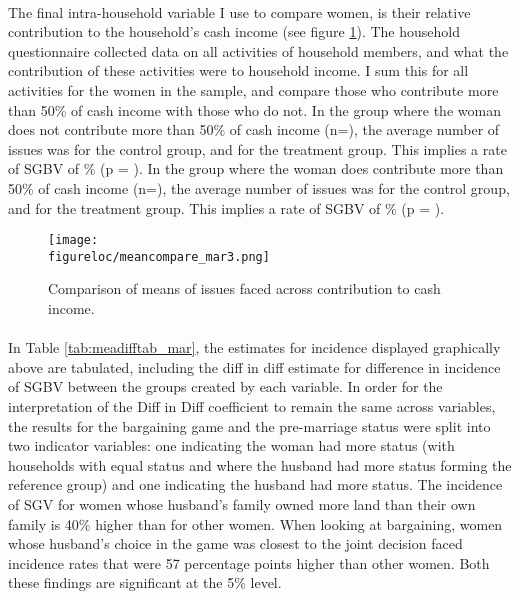 \documentclass[10pt,a4paper]{scrartcl} %
\newcommand{\figureloc}{C:/Users/Koen/Dropbox/PhD/Papers/CongoGBV/Figures}
\begin{document}
\paragraph{}
The final intra-household variable I use to compare women, is their relative contribution to the household's cash income (see figure \ref{fig:meancompare_mar3}). The household questionnaire collected data on all activities of household members, and what the contribution of these activities were to household income. I sum this for all activities for the women in the sample, and compare those who contribute more than 50\% of cash income with those who do not. In the group where the woman does not contribute more than 50\% of cash income (n=), the average number of issues was  for the control group, and  for the treatment group. This implies a rate of SGBV of \% (p = ). In the group where the woman does contribute more than 50\% of cash income (n=), the average number of issues was  for the control group, and  for the treatment group. This implies a rate of SGBV of \% (p = ). 

\begin{figure}[H]
  \texttt{[image: \\figureloc/meancompare\_mar3.png]}
  \caption{Comparison of means of issues faced across contribution to cash income.}
  \label{fig:meancompare_mar3}
\end{figure}


\paragraph{}
In Table \ref{tab:meadifftab_mar}, the estimates for incidence displayed graphically above are tabulated, including the diff in diff estimate for difference in incidence of SGBV between the groups created by each variable. In order for the interpretation of the Diff in Diff coefficient to remain the same across variables, the results for the bargaining game and the pre-marriage status were split into two indicator variables: one indicating the woman had more status (with households with equal status and where the husband had more status forming the reference group) and one indicating the husband had more status. The incidence of SGV for women whose husband's family owned more land than their own family is 40\% higher than for other women. When looking at bargaining, women whose husband's choice in the game was closest to the joint decision faced incidence rates that were 57 percentage points higher than other women. Both these findings are significant at the 5\% level. 
\end{document}
